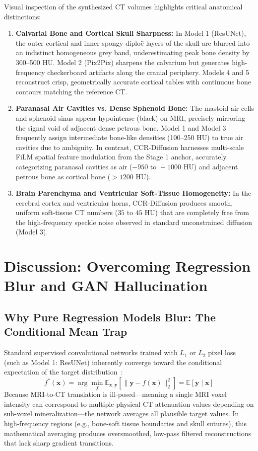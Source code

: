 Visual inspection of the synthesized CT volumes highlights critical anatomical distinctions:
\begin{enumerate}
    \item \textbf{Calvarial Bone and Cortical Skull Sharpness:} In Model 1 (ResUNet), the outer cortical and inner spongy diploë layers of the skull are blurred into an indistinct homogeneous grey band, underestimating peak bone density by 300--500 HU. Model 2 (Pix2Pix) sharpens the calvarium but generates high-frequency checkerboard artifacts along the cranial periphery. Models 4 and 5 reconstruct crisp, geometrically accurate cortical tables with continuous bone contours matching the reference CT.
    \item \textbf{Paranasal Air Cavities vs. Dense Sphenoid Bone:} The mastoid air cells and sphenoid sinus appear hypointense (black) on MRI, precisely mirroring the signal void of adjacent dense petrous bone. Model 1 and Model 3 frequently assign intermediate bone-like densities (100--250 HU) to true air cavities due to ambiguity. In contrast, CCR-Diffusion harnesses multi-scale FiLM spatial feature modulation from the Stage 1 anchor, accurately categorizing paranasal cavities as air ($-950\text{ to }-1000\text{ HU}$) and adjacent petrous bone as cortical bone ($> 1200\text{ HU}$).
    \item \textbf{Brain Parenchyma and Ventricular Soft-Tissue Homogeneity:} In the cerebral cortex and ventricular horns, CCR-Diffusion produces smooth, uniform soft-tissue CT numbers ($35\text{ to }45\text{ HU}$) that are completely free from the high-frequency speckle noise observed in standard unconstrained diffusion (Model 3).
\end{enumerate}

\section{Discussion: Overcoming Regression Blur and GAN Hallucination}

\subsection{Why Pure Regression Models Blur: The Conditional Mean Trap}
Standard supervised convolutional networks trained with $L_1$ or $L_2$ pixel loss (such as Model 1: ResUNet) inherently converge toward the conditional expectation of the target distribution~\cite{nie2017medical,zhang2018road}:
\begin{equation}
f^*(\mathbf{x}) = \arg\min_f \mathbb{E}_{\mathbf{x}, \mathbf{y}}\left[ \|\mathbf{y} - f(\mathbf{x})\|_2^2 \right] = \mathbb{E}[\mathbf{y} \mid \mathbf{x}]
\label{eq:conditional_expectation}
\end{equation}
Because MRI-to-CT translation is ill-posed—meaning a single MRI voxel intensity can correspond to multiple physical CT attenuation values depending on sub-voxel mineralization—the network averages all plausible target values. In high-frequency regions (e.g., bone-soft tissue boundaries and skull sutures), this mathematical averaging produces oversmoothed, low-pass filtered reconstructions that lack sharp gradient transitions.

